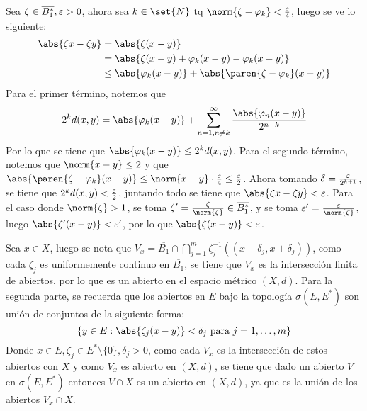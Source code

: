 \documentclass{homework}
\begin{document}
\begin{sol}
    Sea \(\zeta\in\overline{B^*_1},\varepsilon>0\), ahora sea \(k\in\set{N}\) tq \(\norm{\zeta-\varphi_k}<\frac\e4\), luego se ve lo siguiente:
    \begin{align*}
        \abs{\zeta x-\zeta y}&=\abs{\zeta(x-y)}\\
        &=\abs{\zeta(x-y)+\varphi_k(x-y)-\varphi_k(x-y)}\\
        &\leq\abs{\varphi_k(x-y)}+\abs{\paren{\zeta-\varphi_k}(x-y)}
    \end{align*}
    Para el primer término, notemos que
    \begin{equation*}
        2^kd(x,y)=\abs{\varphi_k(x-y)}+\sum_{n=1,n\neq k}^\infty\frac{\abs{\varphi_n(x-y)}}{2^{n-k}}
    \end{equation*}
    Por lo que se tiene que \(\abs{\varphi_k(x-y)}\leq2^kd(x,y)\). Para el segundo término, notemos que \(\norm{x-y}\leq2\) y que \(\abs{\paren{\zeta-\varphi_k}(x-y)}\leq\norm{x-y}\cdot\frac\e4\leq\frac\e2\). Ahora tomando \(\delta=\frac{\varepsilon}{2^{k+1}}\), se tiene que \(2^kd(x,y)<\frac{\varepsilon}2\), juntando todo se tiene que \(\abs{\zeta x-\zeta y}<\e\). Para el caso donde \(\norm{\zeta}>1\), se toma \(\zeta'=\frac\zeta{\norm{\zeta}}\in\overline{B_1^*}\), y se toma \(\e'=\frac\e{\norm{\zeta}}\), luego \(\abs{\zeta'(x-y)}<\e'\), por lo que \(\abs{\zeta(x-y)}<\e\).
\end{sol}

\begin{sol}
    Sea \(x\in X\), luego se nota que \(V_x=\overline{B_1}\cap\bigcap_{j=1}^m\zeta_j^{-1}((x-\delta_j,x+\delta_j))\), como cada \(\zeta_j\) es uniformemente continuo en \(\overline{B_1}\), se tiene que \(V_x\) es la intersección finita de abiertos, por lo que es un abierto en el espacio métrico \((X,d)\). Para la segunda parte, se recuerda que los abiertos en \(E\) bajo la topología \(\sigma(E,E^*)\) son unión de conjuntos de la siguiente forma:
    \begin{equation}
        \{y\in E:\abs{\zeta_j(x-y)}<\delta_j\text{ para }j=1,\dots,m\}
    \end{equation}
    Donde \(x\in E,\zeta_j\in E^*\setminus\{0\},\delta_j>0\), como cada \(V_x\) es la intersección de estos abiertos con \(X\) y como \(V_x\) es abierto en \((X,d)\), se tiene que dado un abierto \(V\) en \(\sigma(E,E^*)\) entonces \(V\cap X\) es un abierto en \((X,d)\), ya que es la unión de los abiertos \(V_x\cap X\).
\end{sol}
\end{document}
